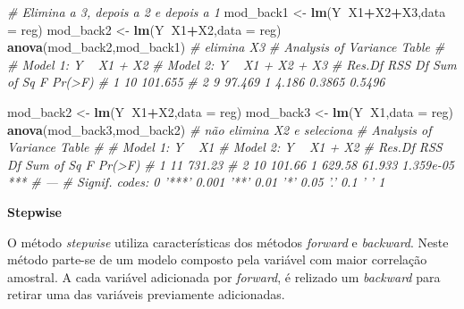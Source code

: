 \documentclass[
]{book}
\newenvironment{Shaded}{\begin{snugshade}}{\end{snugshade}}
\newcommand{\CommentTok}[1]{\textcolor[rgb]{0.56,0.35,0.01}{\textit{#1}}}
\newcommand{\DataTypeTok}[1]{\textcolor[rgb]{0.13,0.29,0.53}{#1}}
\newcommand{\KeywordTok}[1]{\textcolor[rgb]{0.13,0.29,0.53}{\textbf{#1}}}
\newcommand{\NormalTok}[1]{#1}
\newcommand{\OperatorTok}[1]{\textcolor[rgb]{0.81,0.36,0.00}{\textbf{#1}}}
\newcommand{\StringTok}[1]{\textcolor[rgb]{0.31,0.60,0.02}{#1}}
\begin{document}
\begin{Shaded}
\begin{Highlighting}[]
\CommentTok{# Elimina a 3, depois a 2 e depois a 1}
\NormalTok{mod_back1 <-}\StringTok{ }\KeywordTok{lm}\NormalTok{(Y}\OperatorTok{~}\NormalTok{X1}\OperatorTok{+}\NormalTok{X2}\OperatorTok{+}\NormalTok{X3,}\DataTypeTok{data =}\NormalTok{ reg)}
\NormalTok{mod_back2 <-}\StringTok{ }\KeywordTok{lm}\NormalTok{(Y}\OperatorTok{~}\NormalTok{X1}\OperatorTok{+}\NormalTok{X2,}\DataTypeTok{data =}\NormalTok{ reg)}
\KeywordTok{anova}\NormalTok{(mod_back2,mod_back1) }\CommentTok{# elimina X3}
\CommentTok{# Analysis of Variance Table}
\CommentTok{# }
\CommentTok{# Model 1: Y ~ X1 + X2}
\CommentTok{# Model 2: Y ~ X1 + X2 + X3}
\CommentTok{#   Res.Df     RSS Df Sum of Sq      F Pr(>F)}
\CommentTok{# 1     10 101.655                           }
\CommentTok{# 2      9  97.469  1     4.186 0.3865 0.5496}

\NormalTok{mod_back2 <-}\StringTok{ }\KeywordTok{lm}\NormalTok{(Y}\OperatorTok{~}\NormalTok{X1}\OperatorTok{+}\NormalTok{X2,}\DataTypeTok{data =}\NormalTok{ reg)}
\NormalTok{mod_back3 <-}\StringTok{ }\KeywordTok{lm}\NormalTok{(Y}\OperatorTok{~}\NormalTok{X1,}\DataTypeTok{data =}\NormalTok{ reg)}
\KeywordTok{anova}\NormalTok{(mod_back3,mod_back2) }\CommentTok{# não elimina X2 e seleciona}
\CommentTok{# Analysis of Variance Table}
\CommentTok{# }
\CommentTok{# Model 1: Y ~ X1}
\CommentTok{# Model 2: Y ~ X1 + X2}
\CommentTok{#   Res.Df    RSS Df Sum of Sq      F    Pr(>F)    }
\CommentTok{# 1     11 731.23                                  }
\CommentTok{# 2     10 101.66  1    629.58 61.933 1.359e-05 ***}
\CommentTok{# ---}
\CommentTok{# Signif. codes:  0 '***' 0.001 '**' 0.01 '*' 0.05 '.' 0.1 ' ' 1}
\end{Highlighting}
\end{Shaded}

\textbf{Stepwise} 

O método \emph{stepwise} utiliza características dos métodos \emph{forward} e \emph{backward}. Neste método parte-se de um modelo composto pela variável com maior correlação  amostral. A cada variável adicionada por \emph{forward}, é relizado um \emph{backward} para retirar uma das variáveis previamente adicionadas.
\end{document}
